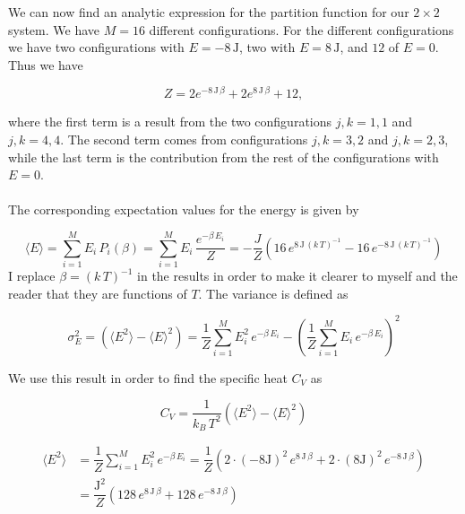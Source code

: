 \documentclass[a4paper, fontsize=11pt]{article}
\begin{document}
We can now find an analytic expression for the partition function for our $2 \times 2$ system. We have $M = 16$ different configurations. For the different configurations we have two configurations with $E = -8 \, \text{J}$, two with $E = 8 \, \text{J}$, and $12$ of $E=0$. Thus we have

\begin{equation}
Z = 2 e^{-8\, \text{J} \, \beta} + 2 e^{8 \,\text{J} \, \beta} + 12,
\end{equation}

where the first term is a result from the two configurations $j,k=1,1$ and $j,k = 4,4$. The second term comes from configurations $j,k = 3,2$ and $j,k = 2,3$, while the last term is the contribution from the rest of the configurations with $E=0$.

\paragraph{}
The corresponding expectation values for the energy is given by

\begin{equation}
\langle E \rangle = \sum^M_{i=1} E_{i} \, P_{i}(\beta) = \sum^M_{i=1} E_{i} \, \dfrac{e^{-\beta \, E_{i}}}{Z} = -\dfrac{J}{Z} \left(16\, e^{8 \, \text{J} \, (k \, T)^{-1}} - 16 \, e^{-8 \, \text{J} \, (k \, T)^{-1}} \right)
\end{equation} 
I replace $\beta = (k \, T)^{-1}$ in the results in order to make it clearer to myself and the reader that they are functions of $T$. The variance is defined as

\begin{equation}
\sigma^2_{E} = \left( \langle E^2 \rangle - \langle E \rangle^2 \right) = \dfrac{1}{Z} \sum^M_{i=1} E_{i}^2 \, e^{-\beta \, E_{i}} - \left( \dfrac{1}{Z} \sum^M_{i=1} E_{i} \, e^{-\beta \, E_{i}} \right)^2
\end{equation}

We use this result in order to find the specific heat  $C_{V}$ as

\begin{equation}
C_{V} = \dfrac{1}{k_{B} \, T^2} \left( \langle E^2 \rangle - \langle E \rangle^2 \right)
\end{equation}

\begin{align}
\langle E^2 \rangle &= \dfrac{1}{Z} \sum^M_{i=1} E_{i}^2 \, e^{-\beta \, E_{i}} = \dfrac{1}{Z} \left( 2 \cdot \left( -8 \text{J} \right)^2 \, e^{8 \, \text{J} \, \beta} + 2 \cdot \left( 8 \text{J} \right)^2 \, e^{-8 \, \text{J} \, \beta} \right)
\\
&= \dfrac{\text{J}^2}{Z} \left( 128 \, e^{8 \, \text{J} \, \beta} + 128 \, e^{-8 \, \text{J} \, \beta} \right)
\end{align}
\end{document}

